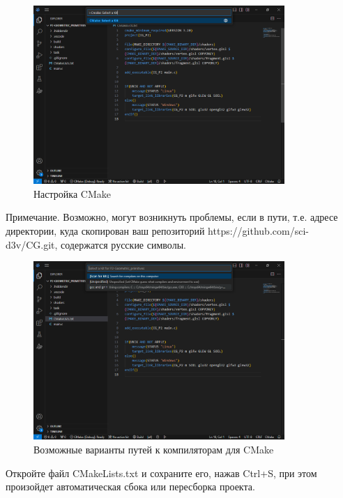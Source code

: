 \documentclass[a4paper,12pt]{article}
\begin{document}
        \begin{figure}[H]
            \centering
			\includegraphics[width=0.85\textwidth]{images/CMake_select_a_Kit.png}
			\caption {Настройка CMake}
            \label{fig:CMake_select_a_Kit}
        \end{figure}

        Примечание.        
        Возможно, могут возникнуть проблемы, если в пути, т.е. адресе директории, куда скопирован ваш репозиторий https://github.com/sci-d3v/CG.git, содержатся русские символы.
        
        
        
        \begin{figure} [H]
            \centering
			\includegraphics[width=0.85\textwidth]{images/CMake_compiler_paths.png}
			\caption {Возможные варианты путей к компиляторам для CMake}
            \label{fig:CMake_compiler_paths}
        \end{figure}

        Откройте файл CMakeLists.txt и сохраните его, нажав Ctrl+S, при этом произойдет автоматическая сбока или пересборка проекта.
\end{document}
